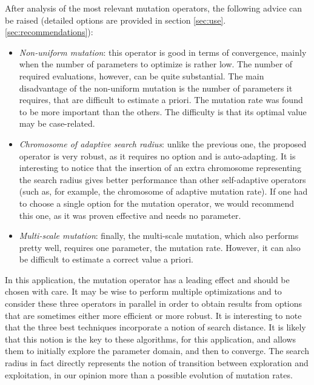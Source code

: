 \documentclass{ametsoc}
\begin{document}
After analysis of the most relevant mutation operators, the following advice can be raised (detailed options are provided in section \ref{sec:use}.\ref{sec:recommendations}):

\begin{itemize}
	
	\item \textit{Non-uniform mutation}: this operator is good in terms of convergence, mainly when the number of parameters to optimize is rather low. The number of required evaluations, however, can be quite substantial. The main disadvantage of the non-uniform mutation is the number of parameters it requires, that are difficult to estimate a priori. The mutation rate was found to be more important than the others. The difficulty is that its optimal value may be case-related.
	
	\item \textit{Chromosome of adaptive search radius}: unlike the previous one, the proposed operator is very robust, as it requires no option and is auto-adapting. It is interesting to notice that the insertion of an extra chromosome representing the search radius gives better performance than other self-adaptive operators (such as, for example, the chromosome of adaptive mutation rate). If one had to choose a single option for the mutation operator, we would recommend this one, as it was proven effective and needs no parameter.
	
	\item \textit{Multi-scale mutation}: finally, the multi-scale mutation, which also performs pretty well, requires one parameter, the mutation rate. However, it can also be difficult to estimate a correct value a priori.
	
\end{itemize}

In this application, the mutation operator has a leading effect and should be chosen with care. It may be wise to perform multiple optimizations and to consider these three operators in parallel in order to obtain results from options that are sometimes either more efficient or more robust. It is interesting to note that the three best techniques incorporate a notion of search distance. It is likely that this notion is the key to these algorithms, for this application, and allows them to initially explore the parameter domain, and then to converge. The search radius in fact directly represents the notion of transition between exploration and exploitation, in our opinion more than a possible evolution of mutation rates.
\end{document}

